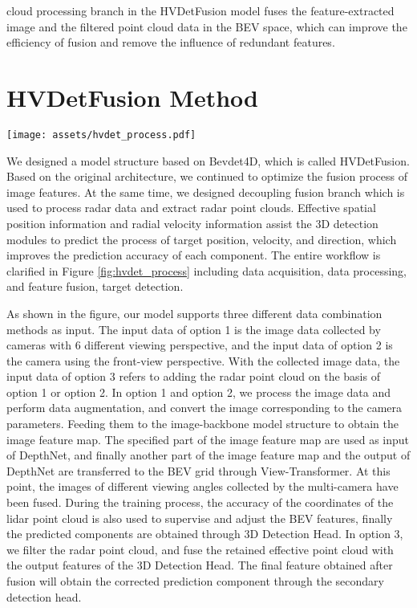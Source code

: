 \documentclass[10pt,twocolumn,letterpaper]{article}
\newcommand\method{HVDetFusion}
\begin{document}
cloud processing branch in the HVDetFusion model fuses the feature-extracted image and the filtered point cloud data in the BEV space, which can improve the efficiency of fusion and remove the influence of redundant features.
\section{\method{} Method}
\begin{figure*}[h]
    \centering
    \texttt{[image: assets/hvdet\_process.pdf]}
    \caption{An image of clarify the process of radar data filtering and fusion}
    \label{fig:hvdet_process}
\end{figure*}
We designed a model structure based on Bevdet4D, which is called HVDetFusion. Based on the original architecture, we continued to optimize the fusion process of image features. At the same time, we designed decoupling fusion branch which is used to process radar data and extract radar point clouds. Effective spatial position information and radial velocity information assist the 3D detection modules to predict the process of target position, velocity, and direction, which improves the prediction accuracy of each component. The entire workflow is clarified in Figure \ref{fig:hvdet_process} including data acquisition, data processing, and feature fusion, target detection.

As shown in the figure, our model supports three different data combination methods as input. The input data of option 1 is the image data collected by cameras with 6 different viewing perspective, and the input data of option 2 is the camera using the front-view perspective. With the collected image data, the input data of option 3 refers to adding the radar point cloud on the basis of option 1 or option 2. In option 1 and option 2, we process the image data and perform data augmentation, and convert the image corresponding to the camera parameters. Feeding them to the image-backbone model structure to obtain the image feature map. The specified part of the image feature map are used as input of DepthNet, and finally another part of the image feature map and the output of DepthNet are transferred to the BEV grid through View-Transformer. At this point, the images of different viewing angles collected by the multi-camera have been fused. During the training process, the accuracy of the coordinates of the lidar point cloud is also used to supervise and adjust the BEV features, finally the predicted components are obtained through 3D Detection Head. In option 3, we filter the radar point cloud, and fuse the retained effective point cloud with the output features of the 3D Detection Head. The final feature obtained after fusion will obtain the corrected prediction component through the secondary detection head.
\end{document}

